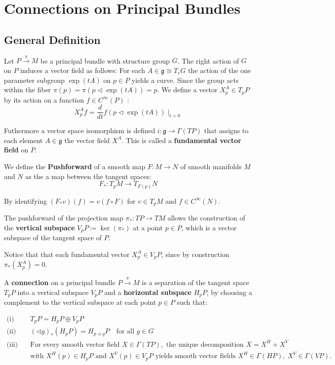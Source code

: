 
\chapter{Connections on Principal Bundles}

\section{General Definition}

Let \( P \xrightarrow{\pi} M \) be a principal bundle with structure group \( G \).
The right action of \( G \) on \(P \) induces a vector field as follows:
For each \( A \in \mathfrak{g} \cong T_eG \) the action of the one parameter subgroup \( \exp(tA) \) on \( p \in P \) yields a curve. Since the group acts within the fiber \( \pi(p) = \pi(p \triangleleft \exp(tA)) = p \). We define a vector \( X^A_p \in T_pP \) by its action on a function \( f \in C^\infty(P) \) \cite{NakaharaGeometrytopologyphysics2005}:
\[ X^A_p f = \frac{d}{dt} f(p \triangleleft \exp(tA))\mid_{t=0} \]

Futhermore a vector space isomorphism is defined \( i: \mathfrak{g} \longrightarrow \Gamma(TP) \) that assigns to each element \( A \in \mathfrak{g} \) the vector field \( X^A \). This is called a \textbf{fundamental vector field} on \( P \).

We define the \textbf{Pushforward} \cite{Pushforward2025} of a smooth map \( F:M \longrightarrow N \) of smooth manifolds \( M \) and \( N \) as the a map between the tangent spaces:
\[ F_* : T_pM \longrightarrow T_{F(p)}N \]

By identifying \( (F_*v)(f) = v(f\circ F) \) for \( v \in T_pM \) and \( f \in C^\infty(N) \).

The pushforward of the projection map \( \pi_* : TP \longrightarrow TM \) allows the construction of the \textbf{vertical subspace} \( V_pP \coloneq \ker(\pi_*) \) at a point \( p \in P \), which is a vector subspace of the tangent space of \( P \).

Notice that that each fundamental vector \( X^A_p \in V_pP \), since by construction \( \pi_* (X^A_p) = 0 \).


A \textbf{connection} on a principal bundle \( P \xrightarrow{\pi} M \) is a separation of the tangent space \( T_pP \) into a vertical subspace \( V_pP \) and a \textbf{horizontal subspace} \( H_pP \), by choosing a complement to the vertical subspace at each point \( p \in P \) such that:

\begin{align*}
  \text{(i)}\quad 
    & T_pP = H_pP \oplus V_pP \\
  \text{(ii)}\quad 
    & (\triangleleft g)_* (H_pP) = H_{p \triangleleft g}P 
    \quad \text{for all } g \in G \\
  \text{(iii)}\quad 
    & \text{For every smooth vector field } X \in \Gamma(TP), \text{ the unique decomposition } 
      X = X^H + X^V \\
    & \text{with } X^H(p) \in H_pP \text{ and } X^V(p) \in V_pP \text{ yields smooth vector fields } 
      X^H \in \Gamma(HP),\ X^V \in \Gamma(VP).
\end{align*}

